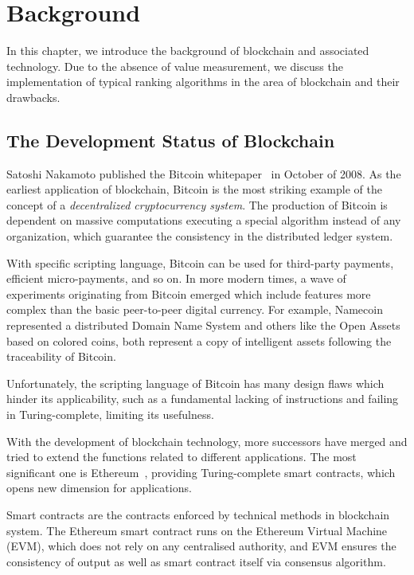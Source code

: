 
\section{Background}
In this chapter, we introduce the background of blockchain and associated technology. Due to the absence of value measurement, we discuss the implementation of typical ranking algorithms in the area of blockchain and their drawbacks.

\subsection{The Development Status of Blockchain}

Satoshi Nakamoto published the Bitcoin whitepaper~\cite{Nakamoto2008} in October of 2008. As the earliest application of blockchain, Bitcoin is the most striking example of the concept of a \emph{decentralized cryptocurrency system}. The production of Bitcoin is dependent on massive computations executing a special algorithm instead of any organization, which guarantee the consistency in the distributed ledger system.

With specific scripting language, Bitcoin can be used for third-party payments, efficient micro-payments, and so on. In more modern times, a wave of experiments originating from Bitcoin emerged which include features more complex than the basic peer-to-peer digital currency. For example, Namecoin~\cite{Namecoin} represented a distributed Domain Name System and others like the Open Assets~\cite{OpenAssets} based on colored coins, both represent a copy of intelligent assets following the traceability of Bitcoin.

Unfortunately, the scripting language of Bitcoin has many design flaws which hinder its applicability, such as a fundamental lacking of instructions and failing in Turing-complete, limiting its usefulness.

With the development of blockchain technology, more successors have merged and tried to extend the functions related to different applications. The most significant one is Ethereum~\cite{buterin2013ethereum}, providing Turing-complete smart contracts, which opens new dimension for applications.

Smart contracts are the contracts enforced by technical methods in blockchain system. The Ethereum smart contract runs on the Ethereum Virtual Machine (EVM), which does not rely on any centralised authority, and EVM ensures the consistency of output as well as smart contract itself via consensus algorithm.

